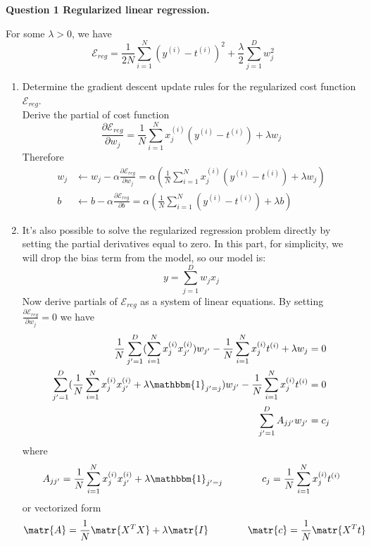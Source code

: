 \documentclass[11pt]{article}
\begin{document}
\textbf{Question 1 Regularized linear regression.}

For some $\lambda > 0$, we have 
\[
    \mathcal{E}_{reg} = 
    \frac{1}{2N} \sum_{i=1}^N (y^{(i)} - t^{(i)})^2 + \frac{\lambda}{2} \sum_{j=1}^D w_j^2    
\]

\begin{enumerate}
    \item Determine the gradient descent update rules for the regularized cost function $\mathcal{E}_{reg}$.\\
    Derive the partial of cost function
    \[
        \frac{\partial \mathcal{E}_{reg}}{\partial w_j}
        = 
        \frac{1}{N} \sum_{i=1}^N x_j^{(i)} (y^{(i)} - t^{(i)}) + \lambda w_j
    \]
    Therefore 
    \begin{align*}
        w_j &\leftarrow w_j - \alpha \frac{\partial\mathcal{E}_{reg}}{\partial w_j} = \alpha \left(
            \frac{1}{N} \sum_{i=1}^N x_j^{(i)} (y^{(i)} - t^{(i)}) + \lambda w_j 
        \right) \\
        b &\leftarrow b - \alpha \frac{\partial\mathcal{E}_{reg}}{\partial b}  = \alpha \left(
            \frac{1}{N} \sum_{i=1}^N (y^{(i)} - t^{(i)}) + \lambda b
        \right)
    \end{align*}
    \item It’s also possible to solve the regularized regression problem directly by setting the partial derivatives equal to zero. In this part, for simplicity, we will drop the bias term from the model, so our model is:
    \[
        y = \sum_{j=1}^D w_j x_j    
    \]
    Now derive partials of $\mathcal{E}_{reg}$ as a system of linear equations. By setting $\frac{\partial \mathcal{E}_{reg}}{\partial w_j} = 0$ we have
    \begin{align*}
        \frac{1}{N}  \sum_{j'=1}^D (  \sum_{i=1}^N x_j^{(i)} x_{j'}^{(i)}) w_{j'} - \frac{1}{N} \sum_{i=1}^N x_j^{(i)} t^{(i)} + \lambda w_j
        &= 0 \\ 
        \sum_{j'=1}^D ( \frac{1}{N} \sum_{i=1}^N x_j^{(i)} x_{j'}^{(i)} + \lambda \mathbbm{1}_{j'=j}) w_{j'} - \frac{1}{N} \sum_{i=1}^N x_j^{(i)} t^{(i)} 
        &= 0 \\
        \sum_{j'=1}^D A_{jj'} w_{j'} &= c_j \\ 
    \end{align*}
    where 
    \[
        A_{jj'} =  \frac{1}{N}\sum_{i=1}^N x_j^{(i)} x_{j'}^{(i)} + \lambda \mathbbm{1}_{j'=j}
        \quad \quad \quad \quad 
        c_j = \frac{1}{N} \sum_{i=1}^N x_j^{(i)} t^{(i)}
    \]
    or vectorized form 
    \[
        \matr{A} = \frac{1}{N} \matr{X^TX} + \lambda \matr{I} 
        \quad \quad \quad \quad 
        \matr{c} = \frac{1}{N} \matr{X^T t}   
    \]
\end{enumerate}
\end{document}
